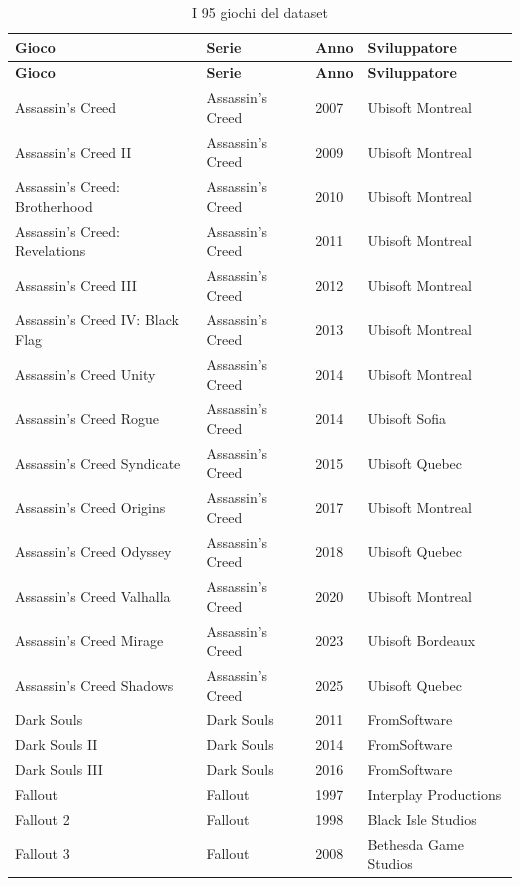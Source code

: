\begingroup\footnotesize\begin{longtable}{p{6.5cm}p{3cm}lp{3.5cm}}
\caption{I 95 giochi del dataset}\\ \toprule
\textbf{Gioco} & \textbf{Serie} & \textbf{Anno} & \textbf{Sviluppatore} \\ \midrule \endfirsthead
\textbf{Gioco} & \textbf{Serie} & \textbf{Anno} & \textbf{Sviluppatore} \\ \midrule \endhead \bottomrule \endfoot
Assassin's Creed & Assassin's Creed & 2007 & Ubisoft Montreal \\
Assassin's Creed II & Assassin's Creed & 2009 & Ubisoft Montreal \\
Assassin's Creed: Brotherhood & Assassin's Creed & 2010 & Ubisoft Montreal \\
Assassin's Creed: Revelations & Assassin's Creed & 2011 & Ubisoft Montreal \\
Assassin's Creed III & Assassin's Creed & 2012 & Ubisoft Montreal \\
Assassin's Creed IV: Black Flag & Assassin's Creed & 2013 & Ubisoft Montreal \\
Assassin's Creed Unity & Assassin's Creed & 2014 & Ubisoft Montreal \\
Assassin's Creed Rogue & Assassin's Creed & 2014 & Ubisoft Sofia \\
Assassin's Creed Syndicate & Assassin's Creed & 2015 & Ubisoft Quebec \\
Assassin's Creed Origins & Assassin's Creed & 2017 & Ubisoft Montreal \\
Assassin's Creed Odyssey & Assassin's Creed & 2018 & Ubisoft Quebec \\
Assassin's Creed Valhalla & Assassin's Creed & 2020 & Ubisoft Montreal \\
Assassin's Creed Mirage & Assassin's Creed & 2023 & Ubisoft Bordeaux \\
Assassin's Creed Shadows & Assassin's Creed & 2025 & Ubisoft Quebec \\
Dark Souls & Dark Souls & 2011 & FromSoftware \\
Dark Souls II & Dark Souls & 2014 & FromSoftware \\
Dark Souls III & Dark Souls & 2016 & FromSoftware \\
Fallout & Fallout & 1997 & Interplay Productions \\
Fallout 2 & Fallout & 1998 & Black Isle Studios \\
Fallout 3 & Fallout & 2008 & Bethesda Game Studios \\

\end{longtable}
